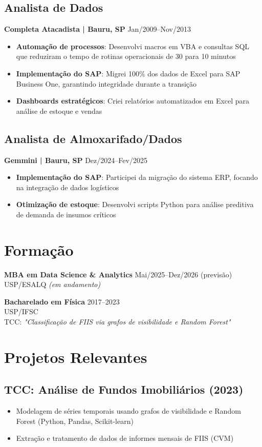 \documentclass[11pt, a4paper]{article}
\begin{document}
\subsection*{Analista de Dados}
\textbf{Completa Atacadista | Bauru, SP} \hfill Jan/2009–Nov/2013
\begin{itemize}
    \item \textbf{Automação de processos}: Desenvolvi macros em VBA e consultas SQL que reduziram o tempo de rotinas operacionais de 30 para 10 minutos
    \item \textbf{Implementação do SAP}: Migrei 100\% dos dados de Excel para SAP Business One, garantindo integridade durante a transição
    \item \textbf{Dashboards estratégicos}: Criei relatórios automatizados em Excel para análise de estoque e vendas
\end{itemize}

\subsection*{Analista de Almoxarifado/Dados}
\textbf{Gemmini | Bauru, SP} \hfill Dez/2024–Fev/2025
\begin{itemize}
    \item \textbf{Implementação do SAP}: Participei da migração do sistema ERP, focando na integração de dados logísticos
    \item \textbf{Otimização de estoque}: Desenvolvi scripts Python para análise preditiva de demanda de insumos críticos
\end{itemize}

\section*{Formação}
\textbf{MBA em Data Science \& Analytics} \hfill Mai/2025–Dez/2026 (previsão)\\
USP/ESALQ \emph{(em andamento)}

\textbf{Bacharelado em Física} \hfill 2017–2023\\
USP/IFSC \\
TCC: \emph{"Classificação de FIIS via grafos de visibilidade e Random Forest"}

\section*{Projetos Relevantes}
\subsection*{TCC: Análise de Fundos Imobiliários (2023)}
\begin{itemize}
    \item Modelagem de séries temporais usando grafos de visibilidade e Random Forest (Python, Pandas, Scikit-learn)
    \item Extração e tratamento de dados de informes mensais de FIIS (CVM)
\end{itemize}
\end{document}
